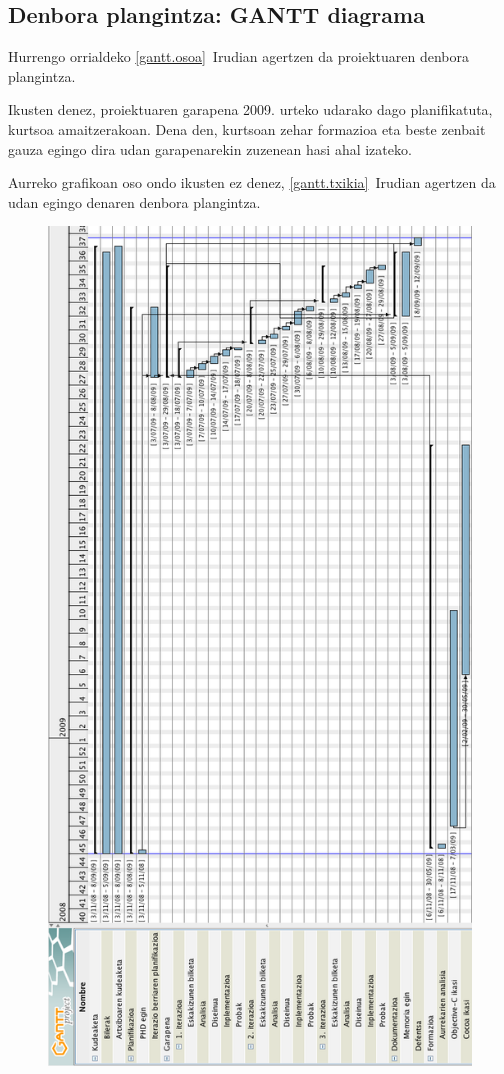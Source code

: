 \subsection{Denbora plangintza: GANTT diagrama}
Hurrengo orrialdeko \ref{gantt.osoa}~Irudian agertzen da proiektuaren denbora plangintza.

Ikusten denez, proiektuaren garapena 2009. urteko udarako dago planifikatuta, kurtsoa amaitzerakoan. Dena den, kurtsoan zehar formazioa eta beste zenbait gauza egingo dira udan garapenarekin zuzenean hasi ahal izateko.

Aurreko grafikoan oso ondo ikusten ez denez, \ref{gantt.txikia}~Irudian agertzen da udan egingo denaren denbora plangintza.

\begin{figure}[htp]
\begin{center}
\includegraphics[scale=0.46]{Pictures/Chapter3/Gantt-osoa.png}

\end{center}
\end{figure}
